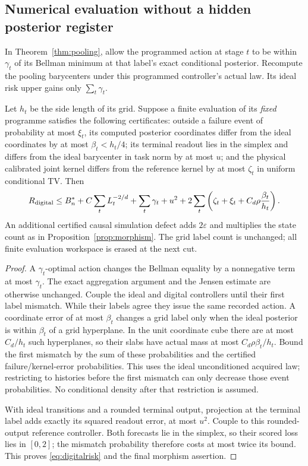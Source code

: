 \subsection{Numerical evaluation without a hidden posterior register}
\begin{proposition}\label{prop:digitalpool}
In Theorem~\ref{thm:pooling}, allow the programmed action at stage $t$ to be within $\gamma_t$ of its Bellman minimum at that label's exact conditional posterior. Recompute the pooling barycenters under this programmed controller's actual law. Its ideal risk upper gains only $\sum_t\gamma_t$.

Let $h_t$ be the side length of its grid. Suppose a finite evaluation of its \emph{fixed} programme satisfies the following certificates: outside a failure event of probability at most $\xi_t$, its computed posterior coordinates differ from the ideal coordinates by at most $\beta_t<h_t/4$; its terminal readout lies in the simplex and differs from the ideal barycenter in task norm by at most $u$; and the physical calibrated joint kernel differs from the reference kernel by at most $\zeta_t$ in uniform conditional TV. Then
\begin{equation}\label{eq:digitalrisk}
\begin{split}
 R_{\rm digital}\le B_n^*+C\sum_t L_t^{-2/d}+\sum_t\gamma_t+u^2
 +2\sum_t\left(\zeta_t+\xi_t+C_d\rho\frac{\beta_t}{h_t}\right).
\end{split}
\end{equation}
An additional certified causal simulation defect adds $2\varepsilon$ and multiplies the state count as in Proposition~\ref{prop:morphism}. The grid label count is unchanged; all finite evaluation workspace is erased at the next cut.
\end{proposition}
\begin{proof}
A $\gamma_t$-optimal action changes the Bellman equality by a nonnegative term at most $\gamma_t$. The exact aggregation argument and the Jensen estimate are otherwise unchanged. Couple the ideal and digital controllers until their first label mismatch. While their labels agree they issue the same recorded action. A coordinate error of at most $\beta_t$ changes a grid label only when the ideal posterior is within $\beta_t$ of a grid hyperplane. In the unit coordinate cube there are at most $C_d/h_t$ such hyperplanes, so their slabs have actual mass at most $C_d\rho\beta_t/h_t$. Bound the first mismatch by the sum of these probabilities and the certified failure/kernel-error probabilities. This uses the ideal unconditioned acquired law; restricting to histories before the first mismatch can only decrease those event probabilities. No conditional density after that restriction is assumed.

With ideal transitions and a rounded terminal output, projection at the terminal label adds exactly its squared readout error, at most $u^2$. Couple to this rounded-output reference controller. Both forecasts lie in the simplex, so their scored loss lies in $[0,2]$; the mismatch probability therefore costs at most twice its bound. This proves \eqref{eq:digitalrisk} and the final morphism assertion.
\end{proof}
